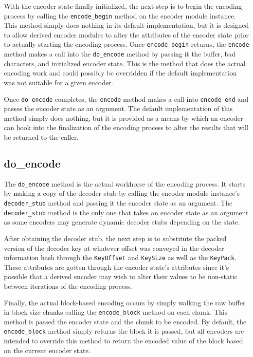 \documentclass{report}
\begin{document}
\par
With the encoder state finally initialized, the next step is to
begin the encoding process by calling the \texttt{encode\_begin}
method on the encoder module instance.  This method simply does
nothing in its default implementation, but it is designed to allow
derived encoder modules to alter the attributes of the encoder state
prior to actually starting the encoding process.  Once
\texttt{encode\_begin} returns, the \texttt{encode} method makes a
call into the \texttt{do\_encode} method by passing it the buffer,
bad characters, and initialized encoder state.  This is the method
that does the actual encoding work and could possibly be overridden
if the default implementation was not suitable for a given encoder.

\par
Once \texttt{do\_encode} completes, the \texttt{encode} method makes
a call into \texttt{encode\_end} and passes the encoder state as an
argument.  The default implementation of this method simply does
nothing, but it is provided as a means by which an encoder can hook
into the finalization of the encoding process to alter the results
that will be returned to the caller.

        \subsection{do\_encode}

\par
The \texttt{do\_encode} method is the actual workhorse of the
encoding process.  It starts by making a copy of the decoder stub by
calling the encoder module instance's \texttt{decoder\_stub} method
and passing it the encoder state as an argument.  The
\texttt{decoder\_stub} method is the only one that takes an encoder
state as an argument as some encoders may generate dynamic decoder
stubs depending on the state.

\par
After obtaining the decoder stub, the next step is to substitute the
packed version of the decoder key at whatever offset was conveyed in
the decoder information hash through the \texttt{KeyOffset} and
\texttt{KeySize} as well as the \texttt{KeyPack}.  These attributes
are gotten through the encoder state's attributes since it's
possible that a derived encoder may wish to alter their values to be
non-static between iterations of the encoding process.

\par
Finally, the actual block-based encoding occurs by simply walking
the raw buffer in block size chunks calling the
\texttt{encode\_block} method on each chunk.  This method is passed
the encoder state and the chunk to be encoded.  By default, the
\texttt{encode\_block} method simply returns the block it is passed,
but all encoders are intended to override this method to return the
encoded value of the block based on the current encoder state.
\end{document}
